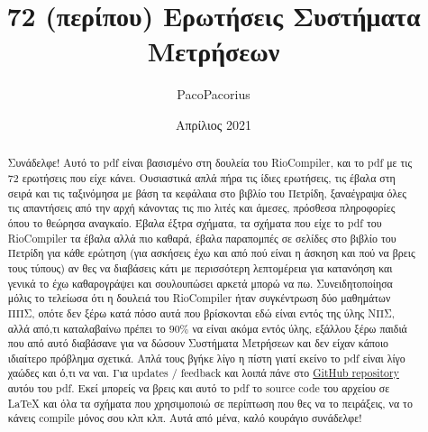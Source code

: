 \documentclass{article}
\title{72 (περίπου) Ερωτήσεις Συστήματα Μετρήσεων}
\author{\foreignlanguage{english}{PacoPacorius}}
\date{Απρίλιος 2021}
\begin{document}
\maketitle

\renewcommand{\abstractname}{Εισαγωγικό σημείωμα}
\begin{abstract}
    Συνάδελφε! Αυτό το \foreignlanguage{english}{pdf} είναι βασισμένο στη δουλεία του \foreignlanguage{english}{RioCompiler}, και το 
    \foreignlanguage{english}{pdf} με τις 72 ερωτήσεις που είχε κάνει. Ουσιαστικά απλά πήρα τις ίδιες ερωτήσεις, τις έβαλα στη σειρά και τις ταξινόμησα με βάση τα 
    κεφάλαια στο βιβλίο του Πετρίδη, ξαναέγραψα όλες τις απαντήσεις από την αρχή κάνοντας τις πιο λιτές και άμεσες, πρόσθεσα πληροφορίες όπου το θεώρησα αναγκαίο. 
    Έβαλα έξτρα σχήματα, τα σχήματα που είχε το \foreignlanguage{english}{pdf} του \foreignlanguage{english}{RioCompiler} τα έβαλα αλλά πιο καθαρά, έβαλα παραπομπές 
    σε σελίδες στο βιβλίο του Πετρίδη για κάθε ερώτηση (για ασκήσεις έχω και από πού είναι η άσκηση και πού να βρεις τους τύπους) αν θες να διαβάσεις κάτι με περισσότερη 
    λεπτομέρεια για κατανόηση και γενικά το έχω καθαρογράψει και σουλουπώσει αρκετά μπορώ να πω. 
\newline
    Συνειδητοποίησα μόλις το τελείωσα ότι η δουλειά του \foreignlanguage{english}{RioCompiler} ήταν συγκέντρωση δύο μαθημάτων ΠΠΣ, οπότε δεν ξέρω κατά πόσο αυτά που 
    βρίσκονται εδώ είναι εντός της ύλης ΝΠΣ, αλλά από,τι καταλαβαίνω πρέπει το $90\%$ να είναι ακόμα εντός ύλης, εξάλλου ξέρω παιδιά που από αυτό διαβάσανε για να δώσουν
    Συστήματα Μετρήσεων και δεν είχαν κάποιο ιδιαίτερο πρόβλημα σχετικά. Απλά τους βγήκε λίγο η πίστη γιατί εκείνο το \foreignlanguage{english}{pdf} είναι λίγο χαώδες και
    ό,τι να ναι.
\newline
    Για \foreignlanguage{english}{updates} $/$ \foreignlanguage{english}{feedback} και λοιπά πάνε στο \foreignlanguage{english}{\href{https://github.com/PacoPacorius/sis-metrisewn-72-erwtiseis-remaster}{GitHub repository}} 
    αυτόυ του \foreignlanguage{english}{pdf}. Εκεί μπορείς να βρεις και αυτό το \foreignlanguage{english}{pdf} το \foreignlanguage{english}{source code} του αρχείου σε
    \foreignlanguage{english}{LaTeX} και όλα τα σχήματα που χρησιμοποιώ σε περίπτωση που θες να το πειράξεις, να το κάνεις \foreignlanguage{english}{compile} μόνος σου
    κλπ κλπ.
\newline
    Αυτά από μένα, καλό κουράγιο συνάδελφε!
\end{abstract}
\end{document}

